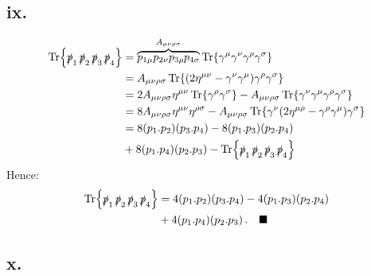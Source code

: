 \documentclass{article}
\newcommand{\slashp}{\slashed{p}}
\begin{document}
\subsection*{ix.}
\begin{equation}
    \begin{split}
        \Tr{\slashp_1\,\slashp_2\,\slashp_3\,\slashp_4}&=\overbrace{p_{1\mu}p_{2\nu}p_{3\rho}p_{4\sigma}}^{A_{\mu\nu\rho\sigma}}\Tr{\gamma^\mu\gamma^\nu\gamma^\rho\gamma^\sigma}\\ &=A_{\mu\nu\rho\sigma}\Tr{(2\eta^{\mu\nu}-\gamma^\nu\gamma^\mu)\gamma^\rho\gamma^\sigma}\\
        &= 2A_{\mu\nu\rho\sigma}\eta^{\mu\nu}\Tr{\gamma^\rho\gamma^\sigma}-A_{\mu\nu\rho\sigma}\Tr{\gamma^\nu\gamma^\mu\gamma^\rho\gamma^\sigma}\\ 
        &= 8A_{\mu\nu\rho\sigma}\eta^{\mu\nu}\eta^{\rho\sigma}-A_{\mu\nu\rho\sigma}\Tr{\gamma^\nu(2\eta^{\mu\rho}-\gamma^\rho\gamma^\mu)\gamma^\sigma}\\
        &= 8(p_1.p_2)(p_3.p_4)-8(p_1.p_3)(p_2.p_4)\\ 
        &+8(p_1.p_4)(p_2.p_3)-\Tr{\slashp_1\,\slashp_2\,\slashp_3\,\slashp_4}
    \end{split}
\end{equation}
Hence:
\begin{equation}
    \begin{split}
        \Tr{\slashp_1\,\slashp_2\,\slashp_3\,\slashp_4}&=4(p_1.p_2)(p_3.p_4)-4(p_1.p_3)(p_2.p_4)\\
        &+4(p_1.p_4)(p_2.p_3)\,. \quad \blacksquare
    \end{split}
\end{equation}


\subsection*{x.}
\end{document}
